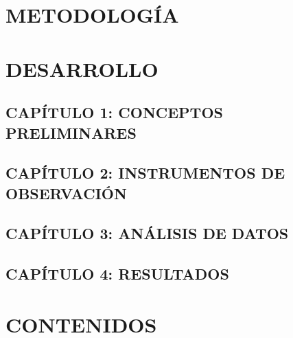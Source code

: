 \chapter{METODOLOGÍA}

\chapter{DESARROLLO}

\section*{CAP\'ITULO 1: CONCEPTOS PRELIMINARES}

\section*{CAP\'ITULO 2: INSTRUMENTOS DE OBSERVACIÓN}

\section*{CAP\'ITULO 3: ANÁLISIS DE DATOS}

\section*{CAP\'ITULO 4: RESULTADOS}

\chapter{CONTENIDOS}

